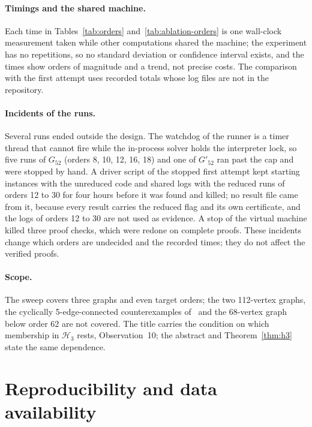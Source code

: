 \documentclass[11pt]{article}
\theoremstyle{definition}
\theoremstyle{remark}
\newcommand{\Hthree}{\mathcal{H}_3}
\newcommand{\Ga}{G_{52}}
\newcommand{\Gb}{G'_{52}}
\begin{document}
\paragraph{Timings and the shared machine.} Each time in Tables~\ref{tab:orders} and~\ref{tab:ablation-orders} is one wall-clock measurement taken while other computations shared the machine; the experiment has no repetitions, so no standard deviation or confidence interval exists, and the times show orders of magnitude and a trend, not precise costs. The comparison with the first attempt uses recorded totals whose log files are not in the repository.

\paragraph{Incidents of the runs.} Several runs ended outside the design. The watchdog of the runner is a timer thread that cannot fire while the in-process solver holds the interpreter lock, so five runs of $\Ga$ (orders 8, 10, 12, 16, 18) and one of $\Gb$ ran past the cap and were stopped by hand. A driver script of the stopped first attempt kept starting instances with the unreduced code and shared logs with the reduced runs of orders
12 to 30 for four hours before it was found and killed; no result file came from it, because every result carries the reduced flag and its own certificate, and the logs of orders 12 to 30 are not used as evidence. A stop of the virtual machine killed three proof checks, which were redone on complete proofs. These incidents change which orders are undecided and the recorded times; they do not affect the verified proofs.

\paragraph{Scope.} The sweep covers three graphs and even target orders; the two 112-vertex graphs, the cyclically 5-edge-connected counterexamples of~\cite{GJMMMU2026} and the 68-vertex graph below order 62 are not covered. The title carries the condition on which membership in $\Hthree$ rests, Observation~10; the abstract and Theorem~\ref{thm:h3} state the same dependence.

\section{Reproducibility and data availability}\label{sec:reproducibility}
\end{document}
